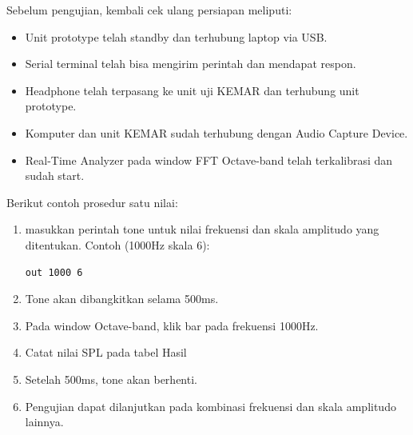 \documentclass[12pt,]{article}
\begin{document}
	Sebelum pengujian, kembali cek ulang persiapan meliputi:
	\begin{itemize}
		\item Unit prototype telah standby dan terhubung laptop via USB.
		\item Serial terminal telah bisa mengirim perintah dan mendapat respon.
		\item Headphone telah terpasang ke unit uji KEMAR dan terhubung unit prototype.
		\item Komputer dan unit KEMAR sudah terhubung dengan Audio Capture Device.
		\item Real-Time Analyzer pada window FFT Octave-band telah terkalibrasi dan sudah start.
	\end{itemize}

	\newpage
	Berikut contoh prosedur satu nilai:
	\begin{enumerate}
		\item masukkan perintah tone untuk nilai frekuensi dan skala amplitudo yang ditentukan.
		Contoh (1000Hz skala 6):
		\begin{verbatim}
out 1000 6
		\end{verbatim}
		
		\item Tone akan dibangkitkan selama 500ms.
		
		\item Pada window Octave-band, klik bar pada frekuensi 1000Hz.
		
		\item Catat nilai SPL pada tabel Hasil
		
		\item Setelah 500ms, tone akan berhenti.
		
		\item Pengujian dapat dilanjutkan pada kombinasi frekuensi dan skala amplitudo lainnya.
	\end{enumerate}
	
\end{document}
